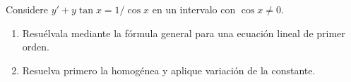 Considere $y'+y\tan x=1/\cos x$ en un intervalo con $\cos x\ne0$.

\begin{enumerate}[label=(\alph*),ref=\alph*,leftmargin=*]
\item Resuélvala mediante la fórmula general para una ecuación lineal de primer orden.
\item Resuelva primero la homogénea y aplique variación de la constante.
\end{enumerate}
